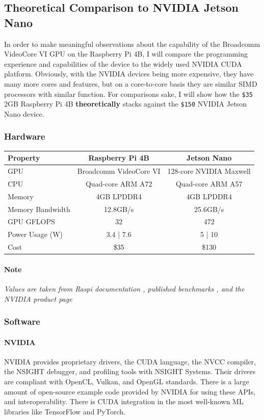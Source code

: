 \documentclass[12pt]{article}
\begin{document}
\subsection{Theoretical Comparison to NVIDIA Jetson Nano}
In order to make meaningful observations about the capability of the Broadcomm VideoCore VI GPU on the Raspberry Pi 4B, I will compare the programming experience and capabilities of the device to the widely used NVIDIA CUDA platform. Obviously, with the NVIDIA devices being more expensive, they have many more cores and features, but on a core-to-core basis they are similar SIMD processors with similar function. For comparisons sake, I will show how the \verb|$35| 2GB Raspberry Pi 4B \textbf{theoretically} stacks against the \verb|$150| NVIDIA Jetson Nano device.

\subsubsection{Hardware}
\begin{center}
\begin{tabular}{|l|c|c|}
\hline
Property & Raspberry Pi 4B & Jetson Nano \\
\hline
GPU & Broadcomm VideoCore VI & 128-core NVIDIA Maxwell \\
\hline
CPU & Quad-core ARM A72 & Quad-core ARM A57  \\
\hline
Memory & 4GB LPDDR4 & 4GB LPDDR4 \\
\hline
Memory Bandwidth & 12.8GB/s & 25.6GB/s \\
\hline
GPU GFLOPS & 32 & 472 \\
\hline
Power Usage (W) & 3.4 | 7.6 & 5 | 10 \\
\hline
Cost & \$35 & \$130 \\
\hline
\end{tabular}
\end{center}

\paragraph{Note}
\textit{Values are taken from Raspi documentation \cite{raspberrypi2024}, published benchmarks \cite{Zwetsloot2024}, and the NVIDIA product page \cite{jetsonstore}}

\subsubsection{Software}

\paragraph{NVIDIA}
NVIDIA provides proprietary drivers, the CUDA language, the NVCC compiler, the NSIGHT debugger, and profiling tools with NSIGHT Systems. Their drivers are compliant with OpenCL, Vulkan, and OpenGL standards. There is a large amount of open-source example code provided by NVIDIA for using these APIs, and interoperability. There is CUDA integration in the most well-known ML libraries like TensorFlow and PyTorch. 
\end{document}

